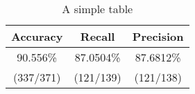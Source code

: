 \begin{scriptsize}
\begin{table}[tbh!]
\centering
\begin{tabular}{|c|c|c|}
\hline
Accuracy  & Recall    & Precision \\ \hline
90.556\%  & 87.0504\% & 87.6812\% \\
(337/371) & (121/139) & (121/138) \\ \hline

\end{tabular}
\caption{A simple table}
\label{table:simple_table}
\end{table}
\end{scriptsize}


